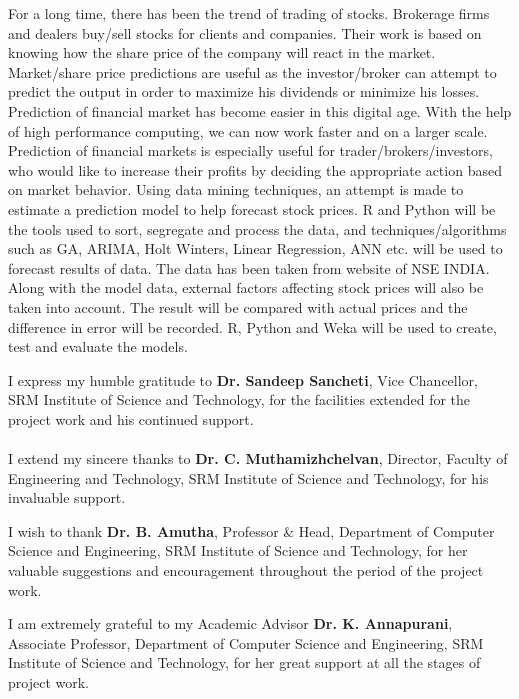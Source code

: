 \documentclass[BTech]{srmuthesis}
\begin{document}
\abstract
\begin{doublespacing}
\noindent For a long time, there has been the trend of trading of stocks. Brokerage firms and dealers buy/sell stocks for clients and companies. Their work is based on knowing how the share price of the company will react in the market. Market/share price predictions are useful as the investor/broker can attempt to predict the output in order to maximize his dividends or minimize his losses. Prediction of financial market has become easier in this digital age. With the help of high performance computing, we can now work faster and on a larger scale. Prediction of financial markets is especially useful for trader/brokers/investors, who would like to increase their profits by deciding the appropriate action based on market behavior. Using data mining techniques, an attempt is made to estimate a prediction model to help forecast stock prices. R and Python will be the tools used to sort, segregate and process the data, and techniques/algorithms such as \ac{GA}, \ac{ARIMA}, Holt Winters, Linear Regression, \ac{ANN} etc. will be used to forecast results of data. The data has been taken from website of NSE INDIA. Along with the model data, external factors affecting stock prices will also be taken into account. The result will be compared with actual prices and the difference in error will be recorded. R, Python and Weka will be used to create, test and evaluate the models.
\end{doublespacing}
\pagebreak
\acknowledgements
I express my humble gratitude to {\bf Dr. Sandeep Sancheti}, Vice Chancellor, SRM Institute of Science and Technology, for the facilities extended for the project work and his continued support.\\ \\
I extend my sincere thanks to {\bf Dr. C. Muthamizhchelvan}, Director, Faculty of Engineering and Technology, SRM Institute of Science and Technology, for his invaluable support.

I wish to thank {\bf Dr. B. Amutha}, Professor \& Head, Department of Computer Science and Engineering, SRM Institute of Science and Technology, for her valuable suggestions and encouragement throughout the period of the project work.

I am extremely grateful to my Academic Advisor {\bf Dr. K. Annapurani}, Associate Professor, Department of Computer Science and Engineering, SRM Institute of Science and Technology, for her great support at all the stages of project work.
\end{document}
